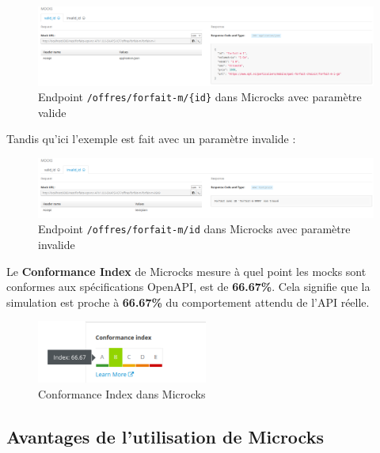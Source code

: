 \documentclass[11pt]{article}
\begin{document}
		\begin{figure}[H]
			\centering
			\includegraphics[width=\textwidth]{asset/mock_forfaitm.png}
			\caption{Endpoint \texttt{/offres/forfait-m/\{id\}} dans Microcks avec paramètre valide}
			\label{fig:endpoint-offres/forfait-m/{id}}
		\end{figure}
		
		Tandis qu'ici l'exemple est fait avec un paramètre invalide :
		
			\begin{figure}[H]
			\centering
			\includegraphics[width=\textwidth]{asset/microcks_invalid.png}
			\caption{Endpoint \texttt{/offres/forfait-m/{id}} dans Microcks avec paramètre invalide}
			\label{fig:endpoint-offres/forfait-m/{id}}
		\end{figure}
		
		Le \textbf{Conformance Index} de Microcks mesure à quel point les mocks sont conformes aux spécifications OpenAPI, est de \textbf{66.67\%}. Cela signifie que la simulation est proche à \textbf{66.67\%} du comportement attendu de l'API réelle.
		
		\begin{figure}[H]
			\centering
			\includegraphics[width=0.5\textwidth]{asset/conformance-index.png}
			\caption{Conformance Index dans Microcks}
			\label{fig:conformance-index}
		\end{figure}
		
		\subsection*{Avantages de l'utilisation de Microcks}
		
\end{document}
